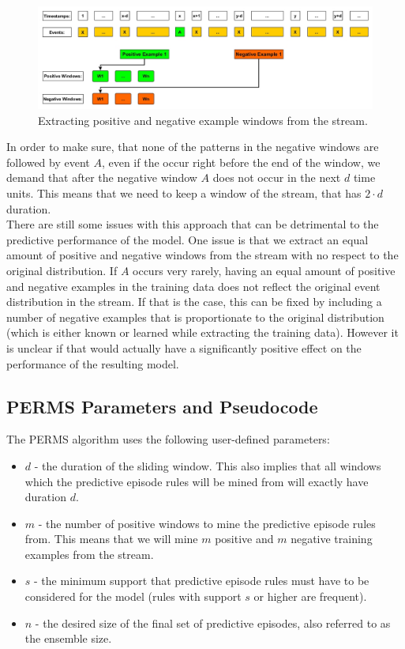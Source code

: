 \begin{figure}[h]
	\centering
  	\includegraphics[width=\textwidth]{trainingDataPositiveAndNegativeWindows}
	\caption{Extracting positive and negative example windows from the stream.}
	\label{fig_trainingDataPositiveAndNegativeWindows}
\end{figure}

In order to make sure, that none of the patterns in the negative windows are followed by event $A$, even if the occur right before the end of the window, we demand that after the negative window $A$ does not occur in the next $d$ time units. This means that we need to keep a window of the stream, that has $2\cdot d$ duration.\\
There are still some issues with this approach that can be detrimental to the predictive performance of the model. One issue is that we extract an equal amount of positive and negative windows from the stream with no respect to the original distribution. If $A$ occurs very rarely, having an equal amount of positive and negative examples in the training data does not reflect the original event distribution in the stream. If that is the case, this can be fixed by including a number of negative examples that is proportionate to the original distribution (which is either known or learned while extracting the training data). However it is unclear if that would actually have a significantly positive effect on the performance of the resulting model.

\subsection{PERMS Parameters and Pseudocode}
\label{subsec_perms}

The PERMS algorithm uses the following user-defined parameters:

\begin{itemize}
	\item \textbf{$d$} - the duration of the sliding window. This also implies that all windows which the predictive episode rules will be mined from will exactly have duration $d$.
	\item \textbf{$m$} - the number of positive windows to mine the predictive episode rules from. This means that we will mine $m$ positive and $m$ negative training examples from the stream.
	\item \textbf{$s$} - the minimum support that predictive episode rules must have to be considered for the model (rules with support $s$ or higher are frequent).
	\item \textbf{$n$} - the desired size of the final set of predictive episodes, also referred to as the ensemble size.
\end{itemize}

